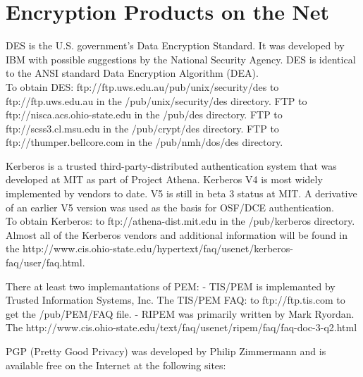 \section{Encryption Products on the Net}

\begin{htmllist}
  \item[DES]
    DES is the U.S. government's Data Encryption Standard. It was developed
    by IBM with possible suggestions by the National Security Agency. DES
    is identical to the ANSI standard Data Encryption Algorithm (DEA).\\

    To obtain DES: %
    {ftp://ftp.uws.edu.au/pub/unix/security/des} to ftp://ftp.uws.edu.au in
    the /pub/unix/security/des directory.
    FTP to ftp://nisca.acs.ohio-state.edu in the /pub/des directory.
    FTP to ftp://scss3.cl.msu.edu in the /pub/crypt/des directory.
    FTP to ftp://thumper.bellcore.com in the /pub/nmh/dos/des directory.

  \item[Kerberos]
    Kerberos is a trusted third-party-distributed authentication system
    that was developed at MIT as part of Project Athena. Kerberos V4 is
    most widely implemented by vendors to date. V5 is still in beta 3
    status at MIT. A derivative of an earlier V5 version was used as the
    basis for OSF/DCE authentication.\\

    To obtain Kerberos:
    to ftp://athena-dist.mit.edu in the /pub/kerberos directory.\\

    Almost all of the Kerberos vendors and additional information will be
    found in the 
    {http://www.cis.ohio-state.edu/hypertext/faq/usenet/kerberos-faq/user/faq.html}.

  \item[PEM]
    There at least two implemantations of PEM:
      - TIS/PEM is implemanted by Trusted Information Systems, Inc. The
      TIS/PEM FAQ: 
      to ftp://ftp.tis.com to get the /pub/PEM/FAQ file.
      - RIPEM was primarily written by Mark Ryordan.
      The 
      {http://www.cis.ohio-state.edu/text/faq/usenet/ripem/faq/faq-doc-3-q2.html}

  \item[PGP]
    PGP (Pretty Good Privacy) was developed by Philip Zimmermann and is
    available free on the Internet at the following sites:\\


\end{htmllist}
